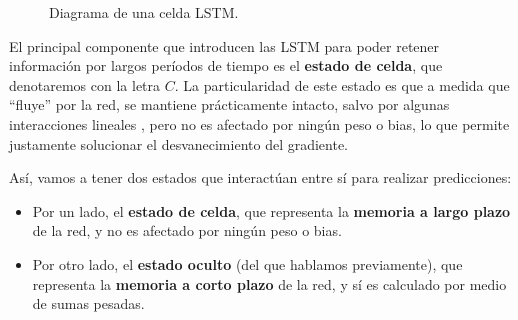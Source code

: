 \documentclass[../../main.tex]{subfiles}
\begin{document}
\begin{figure}
    \caption{Diagrama de una celda LSTM.}
    \label{fig:lstm-cell}
\end{figure}

El principal componente que introducen las LSTM para poder retener información por largos
períodos de tiempo es el \textbf{estado de celda}, que denotaremos con la letra \(C\). La
particularidad de este estado es que a medida que ``fluye'' por la red, se mantiene
prácticamente intacto, salvo por algunas interacciones lineales
\cite{colahs-blog-lstm-2015}, pero no es afectado por ningún peso o bias, lo que permite
justamente solucionar el desvanecimiento del gradiente.

Así, vamos a tener dos estados que interactúan entre sí para realizar predicciones:
\begin{itemize}
    \item Por un lado, el \textbf{estado de celda}, que representa la \textbf{memoria a largo
    plazo} de la red, y no es afectado por ningún peso o bias.
    \item Por otro lado, el \textbf{estado oculto} (del que hablamos previamente), que
    representa la \textbf{memoria a corto plazo} de la red, y sí es calculado por medio
    de sumas pesadas.
\end{itemize}
\end{document}
